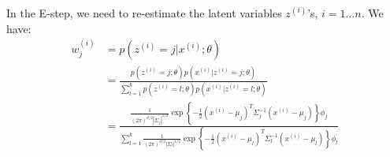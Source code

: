 \begin{answer}
In the E-step, we need to re-estimate the latent variables $z^{(i)}$'s, $i=1 \dots n$. We have:
\begin{align}
	w^{(i)}_j 
	&= p(z^{(i)}=j|x^{(i)};\theta) \\
	&= \frac{p(z^{(i)}=j;\theta)p(x^{(i)}|z^{(i)}=j;\theta)}{\sum_{l=1}^{k} p(z^{(i)}=l;\theta)p(x^{(i)}|z^{(i)}=l;\theta)} \\
	&= \frac{\frac{1}{(2\pi)^{d/2}|\Sigma_j|^{1/2}} \exp\left\{-\frac{1}{2}(x^{(i)}-\mu_j)^T\Sigma_j^{-1}(x^{(i)}-\mu_j)\right\}\phi_j}{\sum_{l=1}^{k}\frac{1}{(2\pi)^{d/2}|\Sigma_l|^{1/2}} \exp\left\{-\frac{1}{2}(x^{(i)}-\mu_l)^T\Sigma_l^{-1}(x^{(i)}-\mu_l)\right\}\phi_l}
\end{align}
\end{answer}

